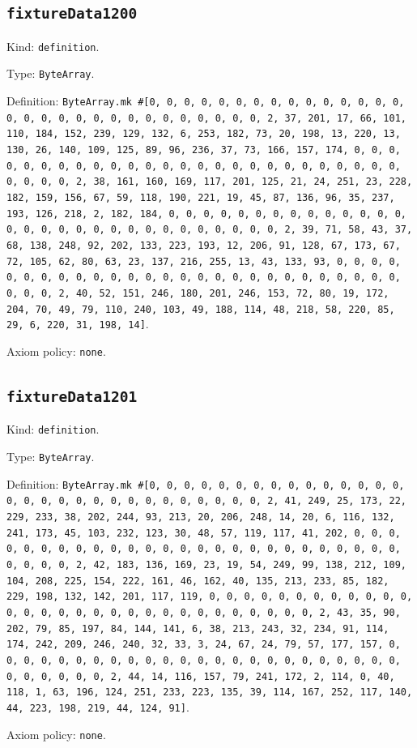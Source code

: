 \documentclass[11pt]{article}
\begin{document}
\subsection*{\texttt{fixtureData1200}}
\noindent Kind: \texttt{definition}.\par
\noindent Type: \texttt{ByteArray}.\par
\noindent Definition: \texttt{ByteArray.mk \#[0, 0, 0, 0, 0, 0, 0, 0, 0, 0, 0, 0, 0, 0, 0, 0, 0, 0, 0, 0, 0, 0, 0, 0, 0, 0, 0, 0, 0, 0, 2, 37, 201, 17, 66, 101, 110, 184, 152, 239, 129, 132, 6, 253, 182, 73, 20, 198, 13, 220, 13, 130, 26, 140, 109, 125, 89, 96, 236, 37, 73, 166, 157, 174, 0, 0, 0, 0, 0, 0, 0, 0, 0, 0, 0, 0, 0, 0, 0, 0, 0, 0, 0, 0, 0, 0, 0, 0, 0, 0, 0, 0, 0, 0, 2, 38, 161, 160, 169, 117, 201, 125, 21, 24, 251, 23, 228, 182, 159, 156, 67, 59, 118, 190, 221, 19, 45, 87, 136, 96, 35, 237, 193, 126, 218, 2, 182, 184, 0, 0, 0, 0, 0, 0, 0, 0, 0, 0, 0, 0, 0, 0, 0, 0, 0, 0, 0, 0, 0, 0, 0, 0, 0, 0, 0, 0, 0, 0, 2, 39, 71, 58, 43, 37, 68, 138, 248, 92, 202, 133, 223, 193, 12, 206, 91, 128, 67, 173, 67, 72, 105, 62, 80, 63, 23, 137, 216, 255, 13, 43, 133, 93, 0, 0, 0, 0, 0, 0, 0, 0, 0, 0, 0, 0, 0, 0, 0, 0, 0, 0, 0, 0, 0, 0, 0, 0, 0, 0, 0, 0, 0, 0, 2, 40, 52, 151, 246, 180, 201, 246, 153, 72, 80, 19, 172, 204, 70, 49, 79, 110, 240, 103, 49, 188, 114, 48, 218, 58, 220, 85, 29, 6, 220, 31, 198, 14]}.\par
\noindent Axiom policy: \texttt{none}.\par
\subsection*{\texttt{fixtureData1201}}
\noindent Kind: \texttt{definition}.\par
\noindent Type: \texttt{ByteArray}.\par
\noindent Definition: \texttt{ByteArray.mk \#[0, 0, 0, 0, 0, 0, 0, 0, 0, 0, 0, 0, 0, 0, 0, 0, 0, 0, 0, 0, 0, 0, 0, 0, 0, 0, 0, 0, 0, 0, 2, 41, 249, 25, 173, 22, 229, 233, 38, 202, 244, 93, 213, 20, 206, 248, 14, 20, 6, 116, 132, 241, 173, 45, 103, 232, 123, 30, 48, 57, 119, 117, 41, 202, 0, 0, 0, 0, 0, 0, 0, 0, 0, 0, 0, 0, 0, 0, 0, 0, 0, 0, 0, 0, 0, 0, 0, 0, 0, 0, 0, 0, 0, 0, 2, 42, 183, 136, 169, 23, 19, 54, 249, 99, 138, 212, 109, 104, 208, 225, 154, 222, 161, 46, 162, 40, 135, 213, 233, 85, 182, 229, 198, 132, 142, 201, 117, 119, 0, 0, 0, 0, 0, 0, 0, 0, 0, 0, 0, 0, 0, 0, 0, 0, 0, 0, 0, 0, 0, 0, 0, 0, 0, 0, 0, 0, 0, 0, 2, 43, 35, 90, 202, 79, 85, 197, 84, 144, 141, 6, 38, 213, 243, 32, 234, 91, 114, 174, 242, 209, 246, 240, 32, 33, 3, 24, 67, 24, 79, 57, 177, 157, 0, 0, 0, 0, 0, 0, 0, 0, 0, 0, 0, 0, 0, 0, 0, 0, 0, 0, 0, 0, 0, 0, 0, 0, 0, 0, 0, 0, 0, 0, 2, 44, 14, 116, 157, 79, 241, 172, 2, 114, 0, 40, 118, 1, 63, 196, 124, 251, 233, 223, 135, 39, 114, 167, 252, 117, 140, 44, 223, 198, 219, 44, 124, 91]}.\par
\noindent Axiom policy: \texttt{none}.\par
\end{document}
